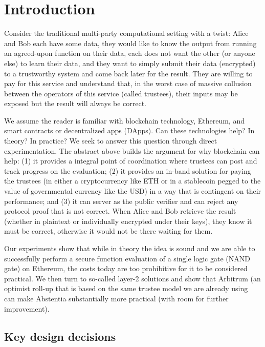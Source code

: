 
\section{Introduction}

Consider the traditional multi-party computational setting with a twist: Alice and Bob each have some data, they would like to know the output from running an agreed-upon function on their data, each does not want the other (or anyone else) to learn their data, and they want to simply submit their data (\eg encrypted) to a trustworthy system and come back later for the result. They are willing to pay for this service and understand that, in the worst case of massive collusion between the operators of this service (called trustees), their inputs may be exposed but the result will always be correct.

We assume the reader is familiar with blockchain technology, Ethereum, and smart contracts or decentralized apps (DApps). Can these technologies help? In theory? In practice? We seek to answer this question through direct experimentation. The abstract above builds the argument for why blockchain can help: (1) it provides a integral point of coordination where trustees can post and track progress on the evaluation; (2) it provides an in-band solution for paying the trustees (in either a cryptocurrency like ETH or in a stablecoin pegged to the value of governmental currency like the USD) in a way that is contingent on their performance; and (3) it can server as the public verifier and can reject any protocol proof that is not correct. When Alice and Bob retrieve the result (whether in plaintext or individually encrypted under their keys), they know it must be correct, otherwise it would not be there waiting for them.

Our experiments show that while in theory the idea is sound and we are able to successfully perform a secure function evaluation of a single logic gate (NAND gate) on Ethereum, the costs today are too prohibitive for it to be considered practical. We then turn to so-called layer-2 solutions and show that Arbitrum (an optimist roll-up that is based on the same trustee model we are already using~\cite{KGCWF18} can make Abstentia substantially more practical (with room for further improvement).
 
\subsection{Key design decisions}

